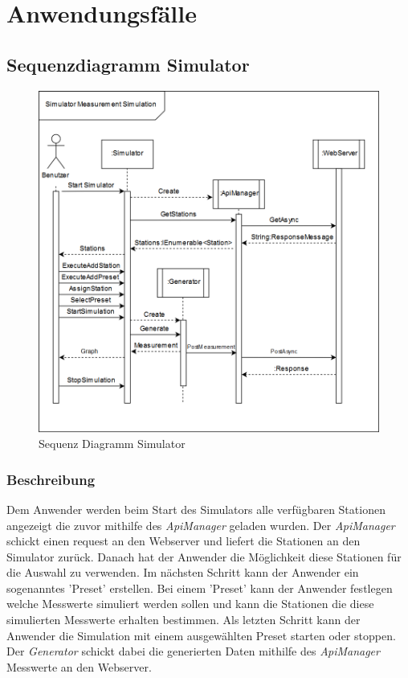\section{Anwendungsfälle}
\subsection{Sequenzdiagramm Simulator}

\begin{figure}[H]
\centering
\includegraphics[scale=0.4]{pictures/sequence/Sequence_simulator_full.png}
\caption{Sequenz Diagramm Simulator}
\label{fig:Wetr.Simulator.Wpf-sequence}
\end{figure}
\raggedright

\subsubsection{Beschreibung}
Dem Anwender werden beim Start des Simulators alle verfügbaren Stationen angezeigt die zuvor mithilfe des \textit{ApiManager} geladen wurden. Der \textit{ApiManager} schickt einen request an den Webserver und liefert die Stationen an den Simulator zurück. Danach hat der Anwender die Möglichkeit diese Stationen für die Auswahl zu verwenden. Im nächsten Schritt kann der Anwender ein sogenanntes 'Preset' erstellen. Bei einem 'Preset' kann der Anwender festlegen welche Messwerte simuliert werden sollen und kann die Stationen die diese simulierten Messwerte erhalten bestimmen. Als letzten Schritt kann der Anwender die Simulation mit einem ausgewählten Preset starten oder stoppen. Der \textit{Generator} schickt dabei die generierten Daten mithilfe des \textit{ApiManager} Messwerte an den Webserver.



